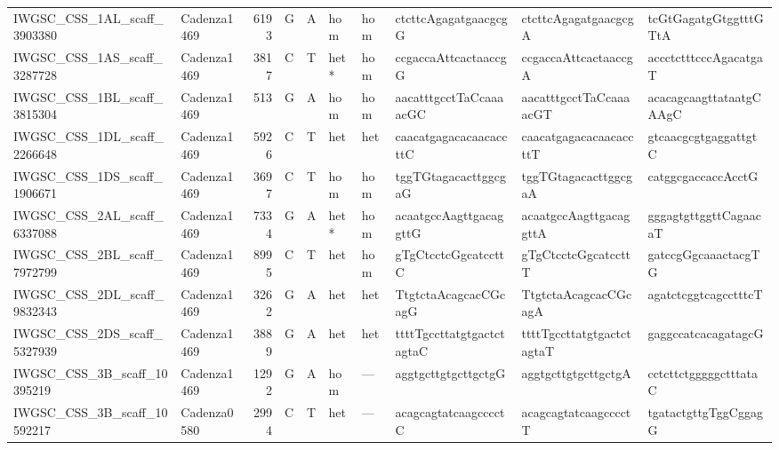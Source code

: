 \begin{longtable}{llrlllllll}
 IWGSC\_CSS\_1AL\_scaff\_3903380  & Cadenza1469 &       6193 & G         & A        & hom            & hom         & ctcttcAgagatgaacgcgG      & ctcttcAgagatgaacgcgA      & tcGtGagatgGtggtttGTtA     \\
 IWGSC\_CSS\_1AS\_scaff\_3287728  & Cadenza1469 &       3817 & C         & T        & het*           & hom         & ccgaccaAttcactaaccgG      & ccgaccaAttcactaaccgA      & accctctttcccAgacatgaT     \\
 IWGSC\_CSS\_1BL\_scaff\_3815304  & Cadenza1469 &        513 & G         & A        & hom            & hom         & aacatttgcctTaCcaaaacGC    & aacatttgcctTaCcaaaacGT    & acacagcaagttataatgCAAgC   \\
 IWGSC\_CSS\_1DL\_scaff\_2266648  & Cadenza1469 &       5926 & C         & T        & het            & het         & caacatgagacacaacaccttC    & caacatgagacacaacaccttT    & gtcaacgcgtgaggattgtC      \\
 IWGSC\_CSS\_1DS\_scaff\_1906671  & Cadenza1469 &       3697 & C         & T        & hom            & hom         & tggTGtagacacttggcgaG      & tggTGtagacacttggcgaA      & catggcgaccaccAcctG        \\
 IWGSC\_CSS\_2AL\_scaff\_6337088  & Cadenza1469 &       7334 & G         & A        & het*           & hom         & acaatgccAagttgacaggttG    & acaatgccAagttgacaggttA    & gggagtgttggttCagaacaT     \\
 IWGSC\_CSS\_2BL\_scaff\_7972799  & Cadenza1469 &       8995 & C         & T        & het            & hom         & gTgCtcctcGgcatccttC       & gTgCtcctcGgcatccttT       & gatccgGgcaaactacgTG       \\
 IWGSC\_CSS\_2DL\_scaff\_9832343  & Cadenza1469 &       3262 & G         & A        & het            & het         & TtgtctaAcagcacCGcagG      & TtgtctaAcagcacCGcagA      & agatctcggtcagcctttcT      \\
 IWGSC\_CSS\_2DS\_scaff\_5327939  & Cadenza1469 &       3889 & G         & A        & het            & het         & ttttTgccttatgtgactctagtaC & ttttTgccttatgtgactctagtaT & gaggccatcacagatagcG       \\
 IWGSC\_CSS\_3B\_scaff\_10395219  & Cadenza1469 &       1292 & G         & A        & hom            & ---         & aggtgcttgtgcttgctgG       & aggtgcttgtgcttgctgA       & cctcttctgggggctttataC     \\
 IWGSC\_CSS\_3B\_scaff\_10592217  & Cadenza0580 &       2994 & C         & T        & het            & ---         & acagcagtatcaagcccctC      & acagcagtatcaagcccctT      & tgatactgttgTggCggagG      \\

\end{longtable}
